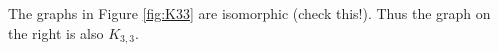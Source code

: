 

\setcounter{section}{1}
\setcounter{subsection}{3}
\setcounter{dfn}{4}

\begin{exl}
The graphs in Figure \ref{fig:K33} are isomorphic (check this!).
Thus the graph on the right is also $K_{3,3}$.
\end{exl}

